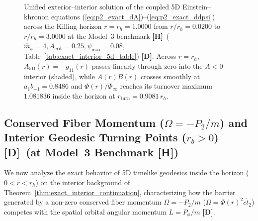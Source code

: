 \documentclass[11pt,a4paper]{article}
\newcommand{\catD}{\textbf{\textcolor{blue!75!black}{[D]}}}
\newcommand{\catH}{\textbf{\textcolor{orange!85!black}{[H]}}}
\theoremstyle{plain}
\theoremstyle{definition}
\theoremstyle{remark}
\numberwithin{equation}{section}
\begin{document}
\begin{figure}[H]
\caption{Unified exterior--interior solution of the coupled 5D Einstein--khronon equations (\ref{eq:p2_exact_dA})--(\ref{eq:p2_exact_ddpsi}) across the Killing horizon $r = r_h = 1.0000$ from $r/r_h = 0.0200$ to $r/r_h = 3.0000$ at the Model~3 benchmark \catH\ ($\hat{m}_{\psi} = 4, A_{\text{crit}} = 0.25, \psi_{\max} = 0.08$, Table~\ref{tab:exact_interior_5d_table}) \catD. Across $r = r_h$, $A_{\text{5D}}(r) = -g_{11}(r)$ passes linearly through zero into the $A < 0$ interior (shaded), while $A(r)B(r)$ crosses smoothly at $a_1 b_{-1} = 0.8486$ and $\Phi(r)/\Phi_{\infty}$ reaches its turnover maximum $1.081836$ inside the horizon at $r_{\text{turn}} = 0.9081\,r_h$.}
\label{fig:unified_ext_int_profiles}
\end{figure}

\subsection{\texorpdfstring{Conserved Fiber Momentum ($\Omega = -P_2/m$) and Interior Geodesic Turning Points ($r_b > 0$) \catD\ (at Model~3 Benchmark \catH)}{Conserved Fiber Momentum and Interior Geodesic Turning Points}}

We now analyze the exact behavior of 5D timelike geodesics inside the horizon ($0 < r < r_h$) on the interior background of Theorem~\ref{thm:exact_interior_continuation}, characterizing how the barrier generated by a non-zero conserved fiber momentum $\Omega = -P_2/m$ ($\Omega = \Phi(r)^2 c\dot{t}_2$) competes with the spatial orbital angular momentum $L = P_{\phi}/m$ \catD.
\end{document}
